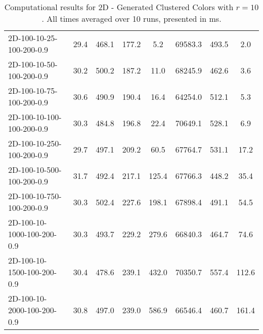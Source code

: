 \documentclass{article}
\begin{document}
\begin{table}[h]
\begin{center}
\begin{tabular}{|l||c|c|c|c|c|c|c|}
            \hline
            2D-100-10-25-100-200-0.9       & 29.4 & 468.1     & 177.2      & 5.2         & 69583.3  & 493.5     & 2.0        \\
            2D-100-10-50-100-200-0.9       & 30.2 & 500.2     & 187.2      & 11.0        & 68245.9  & 462.6     & 3.6        \\
            2D-100-10-75-100-200-0.9       & 30.6 & 490.9     & 190.4      & 16.4        & 64254.0  & 512.1     & 5.3        \\
            2D-100-10-100-100-200-0.9      & 30.3 & 484.8     & 196.8      & 22.4        & 70649.1  & 528.1     & 6.9        \\
            2D-100-10-250-100-200-0.9      & 29.7 & 497.1     & 209.2      & 60.5        & 67764.7  & 531.1     & 17.2       \\
            2D-100-10-500-100-200-0.9      & 31.7 & 492.4     & 217.1      & 125.4       & 67766.3  & 448.2     & 35.4       \\
            2D-100-10-750-100-200-0.9      & 30.3 & 502.4     & 227.6      & 198.1       & 67898.4  & 491.1     & 54.5       \\
            2D-100-10-1000-100-200-0.9     & 30.3 & 493.7     & 229.2      & 279.6       & 66840.3  & 464.7     & 74.6       \\
            2D-100-10-1500-100-200-0.9     & 30.4 & 478.6     & 239.1      & 432.0       & 70350.7  & 557.4     & 112.6      \\
            2D-100-10-2000-100-200-0.9     & 30.8 & 497.0     & 239.0      & 586.9       & 66546.4  & 460.7     & 161.4      \\
            \hline
        \end{tabular}
    \end{center}
    \caption{Computational results for 2D - Generated Clustered Colors with $r=10$. All times averaged over 10 runs, presented in ms.}
\end{table}
\restoregeometry
\end{document}
